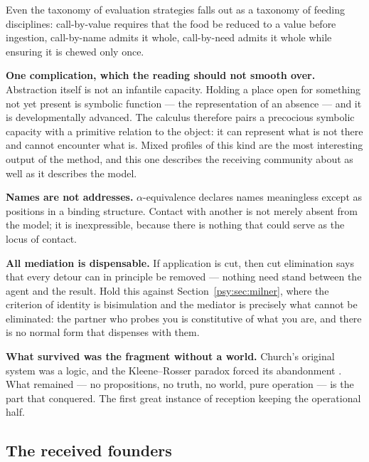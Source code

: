 Even the taxonomy of evaluation strategies falls out as a taxonomy
of feeding disciplines: call-by-value requires that the food be
reduced to a value before ingestion, call-by-name admits it whole,
call-by-need admits it whole while ensuring it is chewed only once.

\textbf{One complication, which the reading should not smooth over.}
Abstraction itself is not an infantile capacity.
Holding a place open for something not yet present is symbolic
function --- the representation of an absence --- and it is
developmentally advanced.
The calculus therefore pairs a precocious symbolic capacity with a
primitive relation to the object: it can represent what is not there
and cannot encounter what is.
Mixed profiles of this kind are the most interesting output of the
method, and this one describes the receiving community about as well
as it describes the model.

\textbf{Names are not addresses.}
$\alpha$-equivalence declares names meaningless except as positions
in a binding structure.
Contact with another is not merely absent from the model; it is
inexpressible, because there is nothing that could serve as the
locus of contact.

\textbf{All mediation is dispensable.}
If application is cut, then cut elimination says that every detour
can in principle be removed --- nothing need stand between the agent
and the result.
Hold this against Section~\ref{psy:sec:milner}, where the criterion
of identity is bisimulation and the mediator is precisely what
cannot be eliminated: the partner who probes you is constitutive of
what you are, and there is no normal form that dispenses with them.

\textbf{What survived was the fragment without a world.}
Church's original system was a logic, and the Kleene--Rosser
paradox forced its abandonment \cite{kleenerosser1935}.
What remained --- no propositions, no truth, no world, pure
operation --- is the part that conquered.
The first great instance of reception keeping the operational half.

\subsection{The received founders}

